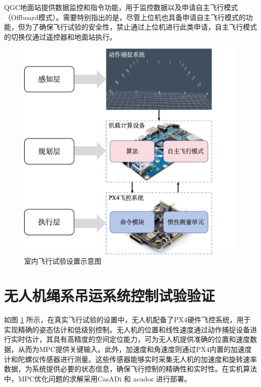\documentclass[lang=chs, degree=master, blindreview=false, winfonts=true]{yanputhesis}
\begin{document}
QGC地面站提供数据监控和指令功能，用于监控数据以及申请自主飞行模式（Offboard模式）。需要特别指出的是，尽管上位机也具备申请自主飞行模式的功能，但为了确保飞行试验的安全性，禁止通过上位机进行此类申请，自主飞行模式的切换仅通过遥控器和地面站执行。
\begin{figure}[hbt!]
	\centering
	\hspace{1.0cm}
	\includegraphics[width=28pc]{picture/5_10.png} 
	\caption{室内飞行试验设置示意图} 
	\label{framewor}
\end{figure}

\section{无人机绳系吊运系统控制试验验证}
如图 \ref{framewor} 所示，在真实飞行试验的设置中，无人机配备了PX4硬件飞控系统，用于实现精确的姿态估计和低级别控制。无人机的位置和线性速度通过动作捕捉设备进行实时估计，其具有高精度的空间定位能力，可为无人机提供准确的位置和速度数据，从而为MPC提供关键输入。此外，加速度和角速度则通过PX4内置的加速度计和陀螺仪传感器进行测量。这些传感器能够实时采集无人机的加速度和旋转速率数据，为系统提供必要的状态信息，确保飞行控制的精确性和实时性。在实机算法中，MPC优化问题的求解采用CasADi \cite{Andersson2019} 和 acados \cite{Verschueren2022} 进行部署。
\end{document}
